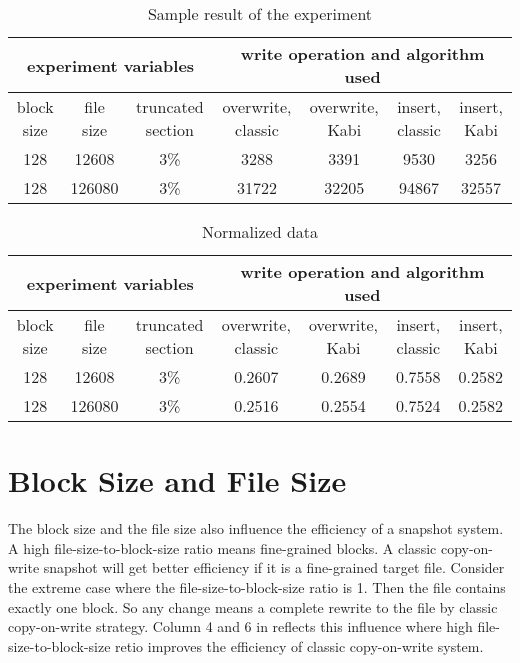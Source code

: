 \begin{lscape} 
\begin{table}
\caption{Sample result of the experiment}
\label{tab:sample_result}
\begin{center}
\begin{tabular}{|c|c|c|c|c|c|c|}
\hline
\multicolumn{3}{|c|}{experiment variables} & \multicolumn{4}{c|}{write operation and algorithm used} \\
\hline
block size & file size & truncated section & overwrite, classic & overwrite, Kabi & insert, classic & insert, Kabi\\
\hline
128 & 12608 & 3\% & 3288 & 3391 & 9530 & 3256 \\
\hline
128 & 126080 & 3\% & 31722 & 32205 & 94867 & 32557 \\
\hline
\end{tabular}
\end{center}
\end{table}

\begin{table}
\caption{Normalized data}
\label{tab:norm}
\begin{center}
\begin{tabular}{|c|c|c|c|c|c|c|}
\hline
\multicolumn{3}{|c|}{experiment variables} & \multicolumn{4}{c|}{write operation and algorithm used} \\
\hline
block size & file size & truncated section & overwrite, classic & overwrite, Kabi & insert, classic & insert, Kabi\\
\hline
128 & 12608 & 3\% & 0.2607 & 0.2689 & 0.7558 & 0.2582 \\
\hline
128 & 126080 & 3\% & 0.2516 & 0.2554 & 0.7524 & 0.2582 \\
\hline
\end{tabular}
\end{center}
\end{table}
\end{lscape}

\section{Block Size and File Size}

    The block size and the file size also influence the efficiency of a snapshot system. A high file-size-to-block-size ratio means fine-grained blocks. A classic copy-on-write snapshot will get better efficiency if it is a fine-grained target file. Consider the extreme case where the file-size-to-block-size ratio is 1. Then the file contains exactly one block. So any change means a complete rewrite to the file by classic copy-on-write strategy. Column 4 and 6 in  reflects this influence where high file-size-to-block-size retio improves the efficiency of classic copy-on-write system.


